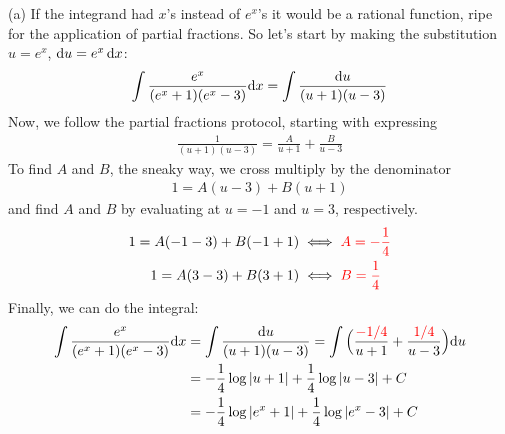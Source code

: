 \begin{solution} (a)
If the integrand had $x$'s instead of $e^x$'s it would be a rational function,
ripe for the application of partial fractions. So let's start by making the
substitution $u=e^x$, $\mathrm{d}u=e^x\,\mathrm{d}x$:
\begin{align*}
\int \frac{e^x}{(e^x+1)(e^x-3)} \mathrm{d}x
  = \int \frac{\mathrm{d}u}{(u+1)(u-3)}
\end{align*}
Now, we follow the partial fractions protocol, starting with expressing
\begin{align*}
\frac{1}{(u+1)(u-3)} = \frac{A}{u+1} + \frac{B}{u-3}
\end{align*}
To find $A$ and $B$, the sneaky way, we cross multiply by the denominator
\begin{align*}
1 = A(u-3) + B(u+1)
\end{align*}
and find $A$ and $B$ by evaluating at $u=-1$ and $u=3$, respectively.
\begin{align*}
1 = A(-1-3) + B(-1+1)  &\iff\color{red} A=-\frac{1}{4} \\
1 = A(3-3) + B(3+1)  &\iff \color{red}B=\frac{1}{4} \\
\end{align*}
Finally, we can do the integral:
\begin{align*}
\int \frac{e^x}{(e^x+1)(e^x-3)} \mathrm{d}x
  &= \int \frac{\mathrm{d}u}{(u+1)(u-3)}
  = \int \Big(\frac{\textcolor{red}{-1/4}}{u+1} + \frac{\textcolor{red}{1/4}}{u-3}\Big)\mathrm{d}u \\
  &=-\frac{1}{4}\log|u+1| +\frac{1}{4}\log|u-3| + C \\
  &=-\frac{1}{4}\log|e^x+1| +\frac{1}{4}\log|e^x-3| + C
\end{align*}


\end{solution}
